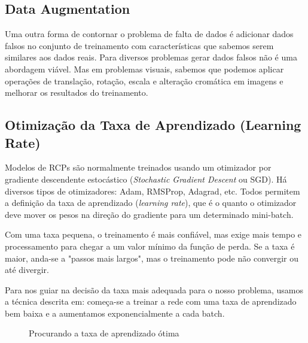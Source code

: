\documentclass[conference]{IEEEtran}
\begin{document}
\subsection{Data Augmentation}
Uma outra forma de contornar o problema de falta de dados é adicionar dados falsos no conjunto de treinamento com características que sabemos serem similares aos dados reais. Para diversos problemas gerar dados falsos não é uma abordagem viável. Mas em problemas visuais, sabemos que podemos aplicar operações de translação, rotação, escala e alteração cromática em imagens e melhorar os resultados do treinamento.


\subsection{Otimização da Taxa de Aprendizado (Learning Rate)}

Modelos de RCPs são normalmente treinados usando um otimizador por gradiente descendente estocástico (\textit{Stochastic Gradient Descent} ou SGD). Há diversos tipos de otimizadores: Adam, RMSProp, Adagrad, etc. Todos permitem a definição da taxa de aprendizado (\textit{learning rate}), que é o quanto o otimizador deve mover os pesos na direção do gradiente para um determinado mini-batch.

Com uma taxa pequena, o treinamento é mais confiável, mas exige mais tempo e processamento para chegar a um valor mínimo da função de perda. Se a taxa é maior, anda-se a "passos mais largos", mas o treinamento pode não convergir ou até divergir. 

Para nos guiar na decisão da taxa mais adequada para o nosso problema, usamos a técnica descrita em\cite{cyclical}: começa-se a treinar a rede com uma taxa de aprendizado bem baixa e a aumentamos exponencialmente a cada batch. 

\begin{figure}
\centering
{}\hfil
{}\hfil 
\caption{Procurando a taxa de aprendizado ótima}
\label{lr_find}
\end{figure}
\end{document}

